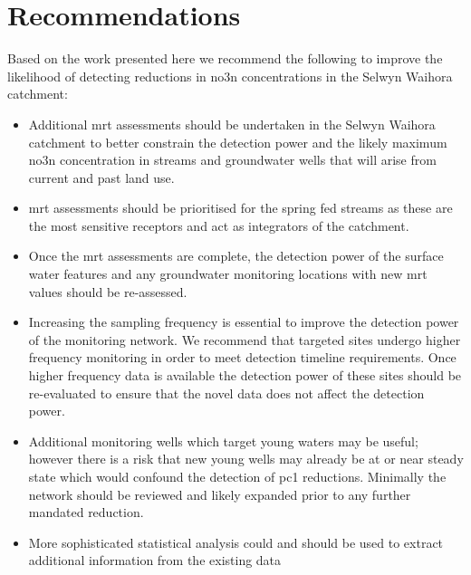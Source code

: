 \section[Recommendations]{Recommendations} \label{sec:recommendations}

Based on the work presented here we recommend the following to improve the likelihood of detecting reductions in \gls{no3n} concentrations in the Selwyn Waihora catchment:
\begin{itemize}
    \item Additional \gls{mrt} assessments should be undertaken in the Selwyn Waihora catchment to better constrain the detection power and the likely maximum \gls{no3n} concentration in streams and groundwater wells that will arise from current and past land use.
    \item \gls{mrt} assessments should be prioritised for the spring fed streams as these are the most sensitive receptors and act as integrators of the catchment.
    \item Once the \gls{mrt} assessments are complete, the detection power of the surface water features and any groundwater monitoring locations with new \gls{mrt} values should be re-assessed.
    \item Increasing the sampling frequency is essential to improve the detection power of the monitoring network. We recommend that targeted sites undergo higher frequency monitoring in order to meet detection timeline requirements. Once higher frequency data is available the detection power of these sites should be re-evaluated to ensure that the novel data does not affect the detection power.
    \item Additional monitoring wells which target young waters may be useful; however there is a risk that new young wells may already be at or near steady state which would confound the detection of \gls{pc1} reductions. Minimally the network should be reviewed and likely expanded prior to any further mandated reduction.
    \item More sophisticated statistical analysis could and should be used to extract additional information from the existing data
\end{itemize}